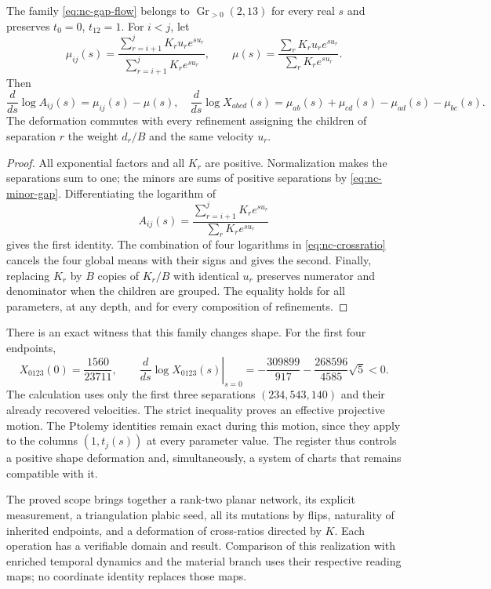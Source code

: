 \begin{theorem}
\label{thm:nc-shape-flow}
The family \eqref{eq:nc-gap-flow} belongs to
\(\operatorname{Gr}_{>0}(2,13)\) for every real \(s\) and preserves
\(t_0=0\), \(t_{12}=1\). For \(i<j\), let
\[
 \mu_{ij}(s)=
 \frac{\sum_{r=i+1}^jK_ru_re^{su_r}}{\sum_{r=i+1}^jK_re^{su_r}},
 \qquad
 \mu(s)=\frac{\sum_rK_ru_re^{su_r}}{\sum_rK_re^{su_r}}.
\]
Then
\begin{equation}
 \frac{d}{ds}\log A_{ij}(s)=\mu_{ij}(s)-\mu(s),
 \quad
 \frac{d}{ds}\log X_{abcd}(s)
 =\mu_{ab}(s)+\mu_{cd}(s)-\mu_{ad}(s)-\mu_{bc}(s).
 \label{eq:nc-crossratio-derivative}
\end{equation}
The deformation commutes with every refinement assigning the children
of separation \(r\) the weight \(d_r/B\) and the same velocity \(u_r\).
\end{theorem}
\begin{proof}
All exponential factors and all \(K_r\) are positive. Normalization
makes the separations sum to one; the minors are sums of positive
separations by \eqref{eq:nc-minor-gap}. Differentiating the logarithm of
\[
 A_{ij}(s)=\frac{\sum_{r=i+1}^jK_re^{su_r}}
                      {\sum_rK_re^{su_r}}
\]
gives the first identity. The combination of four logarithms in
\eqref{eq:nc-crossratio} cancels the four global means with their
signs and gives the second. Finally, replacing \(K_r\) by \(B\)
copies of \(K_r/B\) with identical \(u_r\) preserves numerator
and denominator when the children are grouped. The equality holds
for all parameters, at any depth, and for every composition of refinements.
\end{proof}

There is an exact witness that this family changes shape. For the
first four endpoints,
\begin{equation}
 X_{0123}(0)=\frac{1560}{23711},\qquad
 \left.\frac{d}{ds}\log X_{0123}(s)\right|_{s=0}
 =-\frac{309899}{917}-\frac{268596}{4585}\sqrt5<0.
 \label{eq:nc-nontrivial-witness}
\end{equation}
The calculation uses only the first three separations
\((234,543,140)\) and their already recovered velocities. The strict
inequality proves an effective projective motion. The Ptolemy identities
remain exact during this motion, since they apply to the columns
\((1,t_j(s))\) at every parameter value. The register thus controls
a positive shape deformation and, simultaneously, a system of charts
that remains compatible with it.

The proved scope brings together a rank-two planar network, its explicit
measurement, a triangulation plabic seed, all its mutations by flips,
naturality of inherited endpoints, and a deformation of cross-ratios
directed by \(K\). Each operation has a verifiable domain and result.
Comparison of this realization with enriched temporal dynamics and
the material branch uses their respective reading maps; no coordinate
identity replaces those maps.
